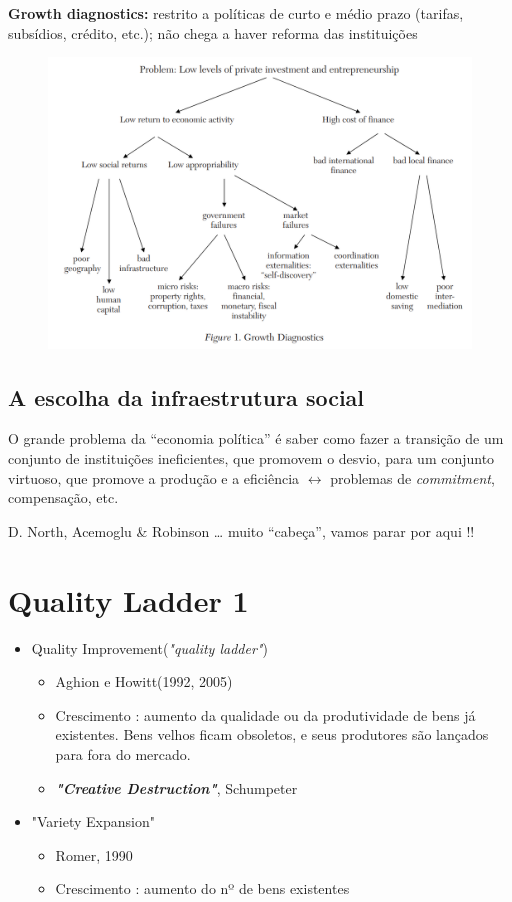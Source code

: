 \documentclass[a4paper,12pt]{article}[abntex2]
\begin{document}
\textbf{Growth diagnostics:} restrito a políticas de curto e médio prazo (tarifas, subsídios, crédito, etc.); não chega a haver reforma das instituições

\begin{figure}[H]
    \centering
    \includegraphics[width=0.7\linewidth]{Imagens/a17i1.png}
\end{figure}

\subsection{\textbf{A escolha da infraestrutura social}}
O grande problema da “economia política” é saber como fazer a transição de um conjunto de instituições ineficientes, que promovem o desvio, para um conjunto virtuoso, que promove a produção e a eficiência \(\leftrightarrow\) problemas de \textit{commitment}, compensação, etc.

D. North, Acemoglu \& Robinson … muito “cabeça”, vamos parar por aqui !!  

\newpage
\section{\textbf{Quality Ladder 1}}

\begin{itemize}
    \item Quality Improvement(\textit{"quality ladder"})\begin{itemize}
        \item Aghion e Howitt(1992, 2005)
        \item Crescimento : aumento da qualidade ou da produtividade de bens já existentes. Bens velhos ficam obsoletos, e seus produtores são lançados para fora do mercado.
        \item \textbf{\textit{"Creative Destruction"}}, Schumpeter
    \end{itemize}
    \item "Variety Expansion"\begin{itemize}
        \item Romer, 1990
        \item Crescimento : aumento do nº de bens existentes
    \end{itemize}
\end{itemize}
\end{document}
